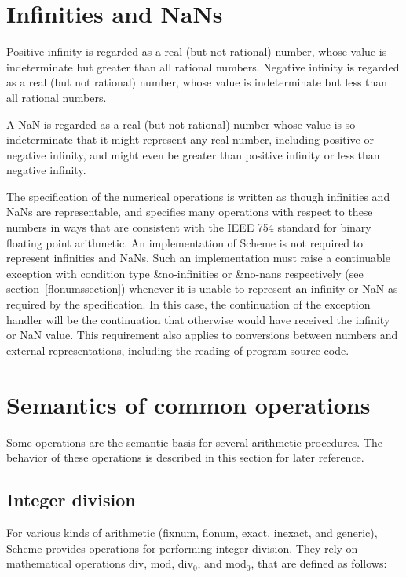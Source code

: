 \section{Infinities and NaNs}
\label{infinitiesnanssection}

Positive infinity is regarded as a real (but not rational) number,
whose value is indeterminate but greater than all rational numbers.
Negative infinity is regarded as a real (but not rational) number,
whose value is indeterminate but less than all rational numbers.

A NaN is regarded as a real (but not rational) number whose value is
so indeterminate that it might represent any real number, including
positive or negative infinity, and might even be greater than positive
infinity or less than negative infinity.

The specification of the numerical operations is written as though
infinities and NaNs are representable, and specifies many operations
with respect to these numbers in ways that are consistent with the
IEEE 754 standard for binary floating point arithmetic.  
An implementation of Scheme is not required to represent infinities and
NaNs. Such an implementation must raise a continuable exception with
condition type {\cf\&no-infinities} or {\cf\&no-nans} respectively
(see section~\ref{flonumssection})
whenever it is unable to represent an infinity or NaN as required by
the specification.  In this case, the continuation of the exception
handler will be the continuation that otherwise would have received
the infinity or NaN value.  This requirement also applies to
conversions between numbers and external representations, including
the reading of program source code.

\section{Semantics of common operations}

Some operations are the semantic basis for several arithmetic
procedures.  The behavior of these operations is described in this
section for later reference.

\subsection{Integer division}
\label{integerdivision}

For various kinds of arithmetic (fixnum, flonum, exact, inexact, and
generic), Scheme provides operations for performing integer
division.  They rely on mathematical operations $\mathrm{div}$,
$\mathrm{mod}$, $\mathrm{div}_0$, and
$\mathrm{mod}_0$, that are defined as follows:

